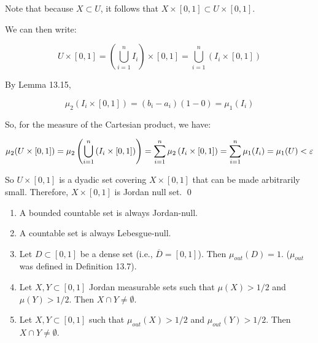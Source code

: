 \documentclass[12pt]{article}
\begin{document}
\begin{enumerate}[label=\alph*)]
    Note that because $X \subset U$, it follows that $X \times [0, 1] \subset U \times [0, 1]$.

    We can then write:

    $$
        U \times [0, 1] = \left(\bigcup\limits_{i = 1}^{n} I_i\right) \times [0, 1] = \bigcup\limits_{i = 1}^n \left(I_i \times [0, 1] \right)
    $$

    By Lemma 13.15,

    $$
    \mu_2(I_i \times [0, 1]) = (b_i - a_i)(1 - 0) = \mu_1(I_i)
    $$

    So, for the measure of the Cartesian product, we have:

    $$
        \mu_2(U \times [0, 1]) = \mu_2\left(\bigcup\limits_{i = 1}^n \left(I_i \times [0, 1] \right)\right) = \sum_{i = 1}^n \mu_2\left(I_i \times [0, 1] \right) = \sum_{i = 1}^n \mu_1(I_i) = \mu_1(U) < \varepsilon
    $$

    So $U \times [0, 1]$ is a dyadic set covering $X \times [0, 1]$ that can be made arbitrarily small. Therefore, $X \times [0, 1]$ is Jordan null set. \qed

\end{enumerate}

\begin{problem}{}{}
    \begin{enumerate}
    \item A bounded countable set is always Jordan-null.
    
    \item A countable set is always Lebesgue-null.
    
    \item Let $D \subset [0, 1]$ be a dense set (i.e., $\overline{D} = [0, 1]$). Then $\mu_{out}(D) = 1$. ($\mu_{out}$ was defined in Definition 13.7).
    
    \item Let $X, Y \subset [0, 1]$ Jordan measurable sets such that $\mu(X) > 1/2$ and $\mu(Y) > 1/2$. Then $X \cap Y \neq \emptyset$.
    
    \item Let $X, Y \subset [0, 1]$ such that $\mu_{out}(X) > 1/2$ and $\mu_{out}(Y) > 1/2$. Then $X \cap Y \neq \emptyset$.
\end{enumerate}
\end{problem}
\end{document}

